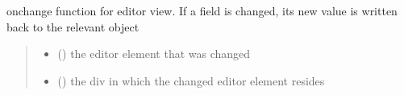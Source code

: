 \documentclass[letterpaper,10pt,english]{sphinxmanual}
\begin{document}
\begin{fulllineitems}
\label{\detokenize{docs_gui/js_api/network_editor/display_editable_network_features:writeBackEditedNetworkFeature}}
\pysigstartsignatures
{}
\pysigstopsignatures
\sphinxAtStartPar
onchange function for editor view. If a field is changed, its new value is written back to the relevant object
\begin{quote}\begin{description}
\begin{itemize}
\item {} 
\sphinxAtStartPar
{} () \textendash{} the editor element that was changed

\item {} 
\sphinxAtStartPar
{} () \textendash{} the div in which the changed editor element resides

\end{itemize}

\end{description}\end{quote}

\end{fulllineitems}

\end{document}
